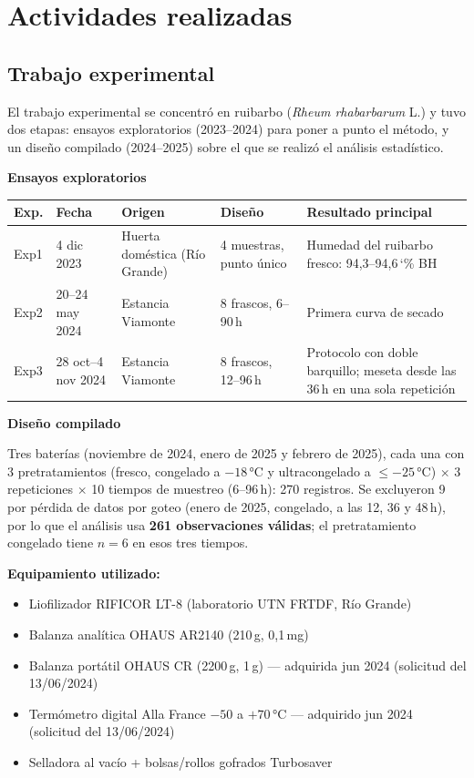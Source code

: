 \documentclass[12pt, a4paper]{article}
\newcommand{\porconf}[1]{\textcolor{orange!85!black}{#1}}
\newcommand{\pct}{\char`\%}
\begin{document}
\section{Actividades realizadas}

\subsection{Trabajo experimental}

El trabajo experimental se concentró en ruibarbo (\textit{Rheum rhabarbarum} L.) y tuvo dos etapas: ensayos exploratorios (2023--2024) para poner a punto el método, y un diseño compilado (2024--2025) sobre el que se realizó el análisis estadístico.

\textbf{Ensayos exploratorios}

\begin{longtable}{p{1cm}p{2.5cm}p{2.5cm}p{2.7cm}p{4.7cm}}
\toprule
\textbf{Exp.} & \textbf{Fecha} & \textbf{Origen} & \textbf{Diseño} & \textbf{Resultado principal} \\
\midrule
Exp1 & 4 dic 2023 & Huerta doméstica (Río Grande) & 4 muestras, punto único & Humedad del ruibarbo fresco: 94,3--94,6\,\pct{} BH \\
Exp2 & 20--24 may 2024 & Estancia Viamonte & 8 frascos, 6--90\,h & Primera curva de secado \\
Exp3 & 28 oct--4 nov 2024 & Estancia Viamonte & 8 frascos, 12--96\,h & Protocolo con doble barquillo; meseta desde las 36\,h en una sola repetición \\
\bottomrule
\end{longtable}

\textbf{Diseño compilado}

Tres baterías (noviembre de 2024, enero de 2025 y febrero de 2025), cada una con 3 pretratamientos (fresco, congelado a $-18$\,°C y ultracongelado a $\leq -25$\,°C) $\times$ 3 repeticiones $\times$ 10 tiempos de muestreo (6--96\,h): 270 registros. Se excluyeron 9 por pérdida de datos por goteo (enero de 2025, congelado, a las 12, 36 y 48\,h), por lo que el análisis usa \textbf{261 observaciones válidas}; el pretratamiento congelado tiene $n = 6$ en esos tres tiempos.

\textbf{Equipamiento utilizado:}
\begin{itemize}[nosep]
    \item Liofilizador RIFICOR LT-8 (laboratorio UTN FRTDF, Río Grande)
    \item Balanza analítica OHAUS AR2140 (210\,g, 0{,}1\,mg)
    \item Balanza portátil OHAUS CR (2200\,g, 1\,g) --- \porconf{adquirida jun 2024} (solicitud del 13/06/2024)
    \item Termómetro digital Alla France $-50$ a $+70$\,°C --- \porconf{adquirido jun 2024} (solicitud del 13/06/2024)
    \item Selladora al vacío + bolsas/rollos gofrados Turbosaver
\end{itemize}
\end{document}
